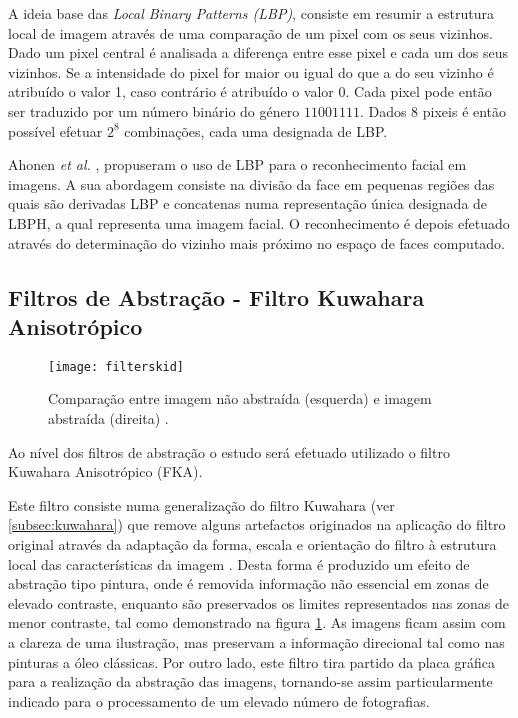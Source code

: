 A ideia base das \textit{Local Binary Patterns (LBP)}, consiste em resumir a estrutura local de imagem através de uma comparação de um pixel com os seus vizinhos. Dado um pixel central é analisada a diferença entre esse pixel e cada um dos seus vizinhos. Se a intensidade do pixel for maior ou igual do que a do seu vizinho é atribuído o valor 1, caso contrário é atribuído o valor 0. Cada pixel pode então ser traduzido por um número binário do género $11001111$. Dados $8$ pixeis é então possível efetuar $2^8$ combinações, cada uma designada de LBP.

Ahonen \textit{et al.} \cite{ahonen2004face}, propuseram o uso de LBP para o reconhecimento facial em imagens. A sua abordagem consiste na divisão da face em pequenas regiões das quais são derivadas LBP e concatenas numa representação única designada de LBPH, a qual representa uma imagem facial. O reconhecimento é depois efetuado através do determinação do vizinho mais próximo no espaço de faces computado.

\subsection{Filtros de Abstração - Filtro Kuwahara Anisotrópico}
\begin{figure}[ht]
  \begin{center}
    \leavevmode
    \texttt{[image: filterskid]}
    \caption{Comparação entre imagem não abstraída (esquerda) e imagem abstraída (direita) \cite{Kyprianidis2009}.}	
    \label{fig:filterskid}
  \end{center}
\end{figure}

Ao nível dos filtros de abstração o estudo será efetuado utilizado o filtro Kuwahara Anisotrópico (FKA).

Este filtro consiste numa generalização do filtro Kuwahara (ver \ref{subsec:kuwahara}) que remove alguns artefactos originados na aplicação do filtro original através da adaptação da forma, escala e orientação do filtro à estrutura local das características da imagem \cite{Kyprianidis2009}. Desta forma é produzido um efeito de abstração tipo pintura, onde é removida informação não essencial em zonas de elevado contraste, enquanto são preservados os limites representados nas zonas de menor contraste, tal como demonstrado na figura \ref{fig:filterskid}. As imagens ficam assim com a clareza de uma ilustração, mas preservam a informação direcional tal como nas pinturas a óleo clássicas. Por outro lado, este filtro tira partido da placa gráfica para a realização da abstração das imagens, tornando-se assim particularmente indicado para o processamento de um elevado número de fotografias.

